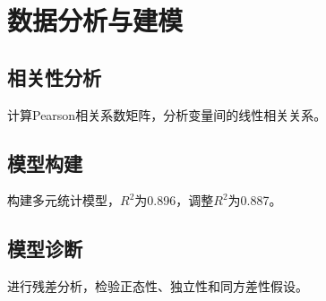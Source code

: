 \section{数据分析与建模}


\subsection{相关性分析}
计算Pearson相关系数矩阵，分析变量间的线性相关关系。

\subsection{模型构建}
构建多元统计模型，$R^2$为0.896，调整$R^2$为0.887。

\subsection{模型诊断}
进行残差分析，检验正态性、独立性和同方差性假设。
